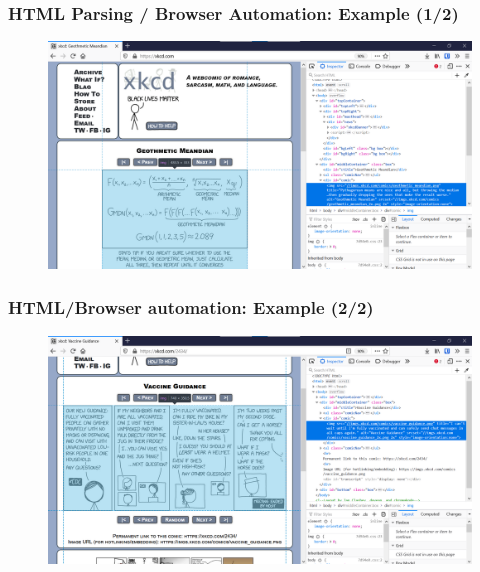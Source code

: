 \documentclass[10pt, aspectratio=1610, natbib, handout]{beamer}
\begin{document}
  \begin{frame}
    \frametitle{HTML Parsing / Browser Automation: Example (1/2)}

    \begin{figure}
      \centering
      \includegraphics[width=\textwidth]{./assets/xkcd-home.png}
    \end{figure}

    \vfill


  \end{frame}

  \begin{frame}
    \frametitle{HTML/Browser automation: Example (2/2)}

    \begin{figure}
      \centering
      \includegraphics[width=\textwidth]{./assets/xkcd-2434.png}
    \end{figure}

    \vfill


  \end{frame}
\end{document}
